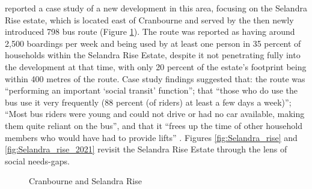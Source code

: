 \documentclass[preprint, 3p,
authoryear]{elsarticle} %
\begin{document}
\citet{delbosc2015impact} reported a case study of a new development in
this area, focusing on the Selandra Rise estate, which is located east
of Cranbourne and served by the then newly introduced 798 bus route
(Figure \ref{fig:Bus_798}). The route was reported as having around
2,500 boardings per week and being used by at least one person in 35
percent of households within the Selandra Rise Estate, despite it not
penetrating fully into the development at that time, with only 20
percent of the estate's footprint being within 400 metres of the route.
Case study findings suggested that: the route was ``performing an
important `social transit' function''; that ``those who do use the bus
use it very frequently (88 percent (of riders) at least a few days a
week)''; ``Most bus riders were young and could not drive or had no car
available, making them quite reliant on the bus'', and that it ``frees
up the time of other household members who would have had to provide
lifts'' \citep[p.10]{delbosc2015impact}. Figures \ref{fig:Selandra_rise}
and \ref{fig:Selandra_rise_2021} revisit the Selandra Rise Estate
through the lens of social needs-gaps.

\begin{figure}

{\centering {}

}

\caption{Cranbourne and Selandra Rise}\label{fig:Bus_798}
\end{figure}
\end{document}
